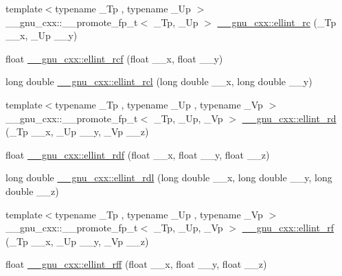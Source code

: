\begin{DoxyCompactItemize}
\item 
{\footnotesize template$<$typename \+\_\+\+Tp , typename \+\_\+\+Up $>$ }\\\+\_\+\+\_\+gnu\+\_\+cxx\+::\+\_\+\+\_\+promote\+\_\+fp\+\_\+t$<$ \+\_\+\+Tp, \+\_\+\+Up $>$ \hyperlink{group__gnu__math__spec__func_ga21b90daf6c8d705b052304905809d2db}{\+\_\+\+\_\+gnu\+\_\+cxx\+::ellint\+\_\+rc} (\+\_\+\+Tp \+\_\+\+\_\+x, \+\_\+\+Up \+\_\+\+\_\+y)
\item 
float \hyperlink{group__gnu__math__spec__func_gaad5316092224ec3d92b66e79ef266adf}{\+\_\+\+\_\+gnu\+\_\+cxx\+::ellint\+\_\+rcf} (float \+\_\+\+\_\+x, float \+\_\+\+\_\+y)
\item 
long double \hyperlink{group__gnu__math__spec__func_ga9b2f1cdeacd3615c702a77d995a0129c}{\+\_\+\+\_\+gnu\+\_\+cxx\+::ellint\+\_\+rcl} (long double \+\_\+\+\_\+x, long double \+\_\+\+\_\+y)
\item 
{\footnotesize template$<$typename \+\_\+\+Tp , typename \+\_\+\+Up , typename \+\_\+\+Vp $>$ }\\\+\_\+\+\_\+gnu\+\_\+cxx\+::\+\_\+\+\_\+promote\+\_\+fp\+\_\+t$<$ \+\_\+\+Tp, \+\_\+\+Up, \+\_\+\+Vp $>$ \hyperlink{group__gnu__math__spec__func_ga6467a19028332392df825e232a97139f}{\+\_\+\+\_\+gnu\+\_\+cxx\+::ellint\+\_\+rd} (\+\_\+\+Tp \+\_\+\+\_\+x, \+\_\+\+Up \+\_\+\+\_\+y, \+\_\+\+Vp \+\_\+\+\_\+z)
\item 
float \hyperlink{group__gnu__math__spec__func_ga52e7cc797b9d199b7468cdbec6505357}{\+\_\+\+\_\+gnu\+\_\+cxx\+::ellint\+\_\+rdf} (float \+\_\+\+\_\+x, float \+\_\+\+\_\+y, float \+\_\+\+\_\+z)
\item 
long double \hyperlink{group__gnu__math__spec__func_ga68a38a5f320a7184cec4b120ddef6a65}{\+\_\+\+\_\+gnu\+\_\+cxx\+::ellint\+\_\+rdl} (long double \+\_\+\+\_\+x, long double \+\_\+\+\_\+y, long double \+\_\+\+\_\+z)
\item 
{\footnotesize template$<$typename \+\_\+\+Tp , typename \+\_\+\+Up , typename \+\_\+\+Vp $>$ }\\\+\_\+\+\_\+gnu\+\_\+cxx\+::\+\_\+\+\_\+promote\+\_\+fp\+\_\+t$<$ \+\_\+\+Tp, \+\_\+\+Up, \+\_\+\+Vp $>$ \hyperlink{group__gnu__math__spec__func_ga9242fbc43bd340e0def2a6f15b755c1c}{\+\_\+\+\_\+gnu\+\_\+cxx\+::ellint\+\_\+rf} (\+\_\+\+Tp \+\_\+\+\_\+x, \+\_\+\+Up \+\_\+\+\_\+y, \+\_\+\+Vp \+\_\+\+\_\+z)
\item 
float \hyperlink{group__gnu__math__spec__func_ga39acf5c69a85f9b687478b32847156da}{\+\_\+\+\_\+gnu\+\_\+cxx\+::ellint\+\_\+rff} (float \+\_\+\+\_\+x, float \+\_\+\+\_\+y, float \+\_\+\+\_\+z)
\item 

\end{DoxyCompactItemize}

